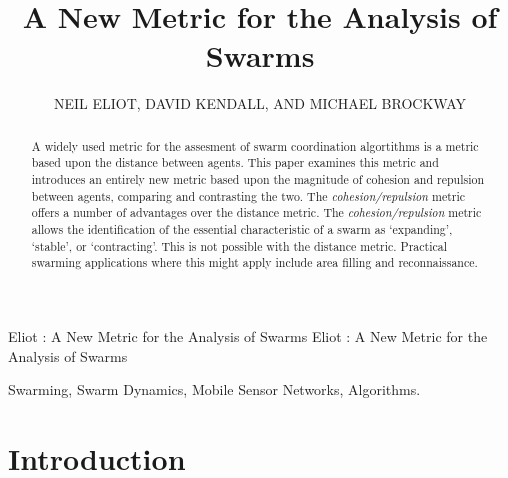 \documentclass{ieeeaccess}
\begin{document}

\title{A New Metric for the Analysis of Swarms}
\author{\uppercase{Neil Eliot},
\uppercase{David Kendall, and Michael Brockway}}
\address[1]{Northumbria University, Department of Computing and Information Sciences, 
Newcastle upon Tyne, NE1 8ST}

\markboth
{Eliot \headeretal: A New Metric for the Analysis of Swarms}
{Eliot \headeretal: A New Metric for the Analysis of Swarms}



\begin{abstract}
  A widely used metric for the assesment of swarm coordination algortithms is a metric based upon the distance between agents.
  This paper examines this metric and introduces an entirely new metric based upon the magnitude of cohesion and repulsion between agents, comparing and
  contrasting the two.  
  The \emph{cohesion/repulsion} metric offers a
  number of advantages over the distance metric. The
  \emph{cohesion/repulsion} metric allows the identification of the
  essential characteristic of a swarm as `expanding', `stable', or
  `contracting'. This is not possible with the distance metric. Practical
  swarming applications where this might apply include area filling and reconnaissance.
\end{abstract}

\begin{keywords}
Swarming, Swarm Dynamics, Mobile Sensor Networks, Algorithms.
\end{keywords}


\titlepgskip=-15pt
\maketitle


\section{Introduction\label{sec:intro}}
\end{document}
